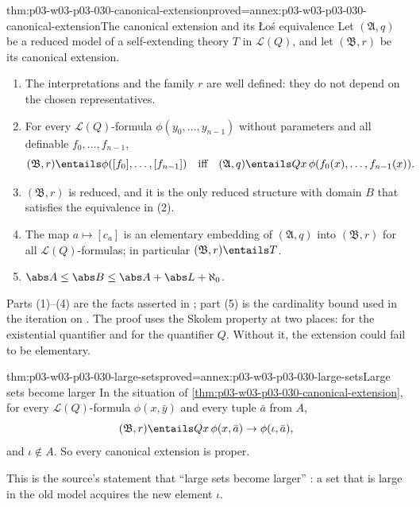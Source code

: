 \begin{hbtheorem}{thm:p03-w03-p03-030-canonical-extension}{proved=annex:p03-w03-p03-030-canonical-extension}{The canonical extension and its \L o\'s equivalence}
Let \((\mathfrak A,q)\) be a reduced model of a self-extending theory \(T\)
in \(\mathscr L(Q)\), and let \((\mathfrak B,r)\) be its canonical extension.
\begin{enumerate}
\item The interpretations and the family \(r\) are well defined: they do not
  depend on the chosen representatives.
\item For every \(\mathscr L(Q)\)-formula \(\phi(y_0,\ldots,y_{n-1})\) without
  parameters and all definable \(f_0,\ldots,f_{n-1}\),
  \[
   (\mathfrak B,r)\entails\phi([f_0],\ldots,[f_{n-1}])
   \quad\text{iff}\quad
   (\mathfrak A,q)\entails Qx\,\phi(f_0(x),\ldots,f_{n-1}(x)).
  \]
\item \((\mathfrak B,r)\) is reduced, and it is the only reduced structure
  with domain \(B\) that satisfies the equivalence in (2).
\item The map \(a\mapsto[c_a]\) is an elementary embedding of
  \((\mathfrak A,q)\) into \((\mathfrak B,r)\) for all
  \(\mathscr L(Q)\)-formulas; in particular \((\mathfrak B,r)\entails T\).
\item \(\abs A\le\abs B\le\abs A+\abs L+\aleph_0\).
\end{enumerate}
\end{hbtheorem}

Parts (1)--(4) are the facts asserted in
\cite[p.~203]{Schmerl1985TransferTheorems}; part (5) is the cardinality
bound used in the iteration on
\cite[p.~205]{Schmerl1985TransferTheorems}.  The proof uses the Skolem
property at two places: for the existential quantifier and for the
quantifier \(Q\).  Without it, the extension could fail to be elementary.

\begin{hbcorollary}{thm:p03-w03-p03-030-large-sets}{proved=annex:p03-w03-p03-030-large-sets}{Large sets become larger}
In the situation of \cref{thm:p03-w03-p03-030-canonical-extension}, for every
\(\mathscr L(Q)\)-formula \(\phi(x,\bar y)\) and every tuple \(\bar a\) from
\(A\),
\[
 (\mathfrak B,r)\entails Qx\,\phi(x,\bar a)\rightarrow\phi(\iota,\bar a),
\]
and \(\iota\notin A\).  So every canonical extension is proper.
\end{hbcorollary}

This is the source's statement that ``large sets become larger''
\cite[p.~203]{Schmerl1985TransferTheorems}: a set that is large in the old
model acquires the new element \(\iota\).

